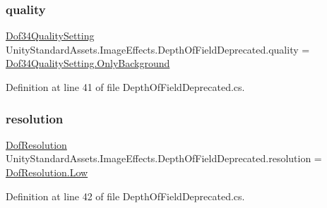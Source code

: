 \subsubsection{\texorpdfstring{quality}{quality}}
{\footnotesize\ttfamily \mbox{\hyperlink{class_unity_standard_assets_1_1_image_effects_1_1_depth_of_field_deprecated_a49aeac3eaa0d36567973103fb895b1d9}{Dof34\+Quality\+Setting}} Unity\+Standard\+Assets.\+Image\+Effects.\+Depth\+Of\+Field\+Deprecated.\+quality = \mbox{\hyperlink{class_unity_standard_assets_1_1_image_effects_1_1_depth_of_field_deprecated_a49aeac3eaa0d36567973103fb895b1d9aa3c2f94bc3e93295c2d2eae9587089a3}{Dof34\+Quality\+Setting.\+Only\+Background}}}



Definition at line 41 of file Depth\+Of\+Field\+Deprecated.\+cs.

\mbox{\label{class_unity_standard_assets_1_1_image_effects_1_1_depth_of_field_deprecated_a9651a60202f4d3c34ee840334293c923}} 
\subsubsection{\texorpdfstring{resolution}{resolution}}
{\footnotesize\ttfamily \mbox{\hyperlink{class_unity_standard_assets_1_1_image_effects_1_1_depth_of_field_deprecated_afba0d38461312bf69068aee575fed15d}{Dof\+Resolution}} Unity\+Standard\+Assets.\+Image\+Effects.\+Depth\+Of\+Field\+Deprecated.\+resolution = \mbox{\hyperlink{class_unity_standard_assets_1_1_image_effects_1_1_depth_of_field_deprecated_afba0d38461312bf69068aee575fed15da28d0edd045e05cf5af64e35ae0c4c6ef}{Dof\+Resolution.\+Low}}}



Definition at line 42 of file Depth\+Of\+Field\+Deprecated.\+cs.

\mbox{\label{class_unity_standard_assets_1_1_image_effects_1_1_depth_of_field_deprecated_a2949e8a9c6b625685ce6794378c420c2}} 
